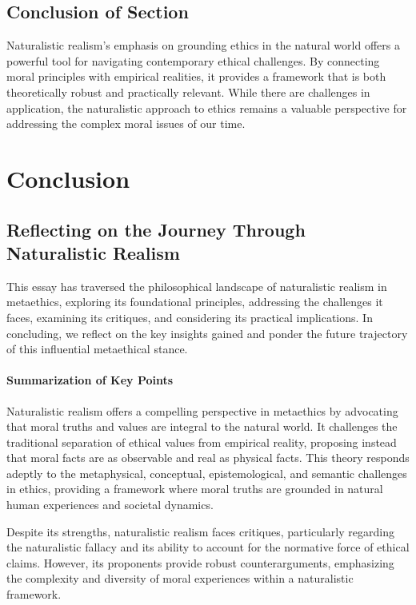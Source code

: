 \documentclass[12pt,a4paper]{article}
\begin{document}
\subsection{Conclusion of Section}
Naturalistic realism's emphasis on grounding ethics in the natural world offers a powerful tool for navigating contemporary ethical challenges. By connecting moral principles with empirical realities, it provides a framework that is both theoretically robust and practically relevant. While there are challenges in application, the naturalistic approach to ethics remains a valuable perspective for addressing the complex moral issues of our time.

\newpage
\section*{Conclusion}

\subsection*{Reflecting on the Journey Through Naturalistic Realism}
This essay has traversed the philosophical landscape of naturalistic realism in metaethics, exploring its foundational principles, addressing the challenges it faces, examining its critiques, and considering its practical implications. In concluding, we reflect on the key insights gained and ponder the future trajectory of this influential metaethical stance.

\paragraph{Summarization of Key Points}
Naturalistic realism offers a compelling perspective in metaethics by advocating that moral truths and values are integral to the natural world. It challenges the traditional separation of ethical values from empirical reality, proposing instead that moral facts are as observable and real as physical facts. This theory responds adeptly to the metaphysical, conceptual, epistemological, and semantic challenges in ethics, providing a framework where moral truths are grounded in natural human experiences and societal dynamics.

Despite its strengths, naturalistic realism faces critiques, particularly regarding the naturalistic fallacy and its ability to account for the normative force of ethical claims. However, its proponents provide robust counterarguments, emphasizing the complexity and diversity of moral experiences within a naturalistic framework.
\end{document}
